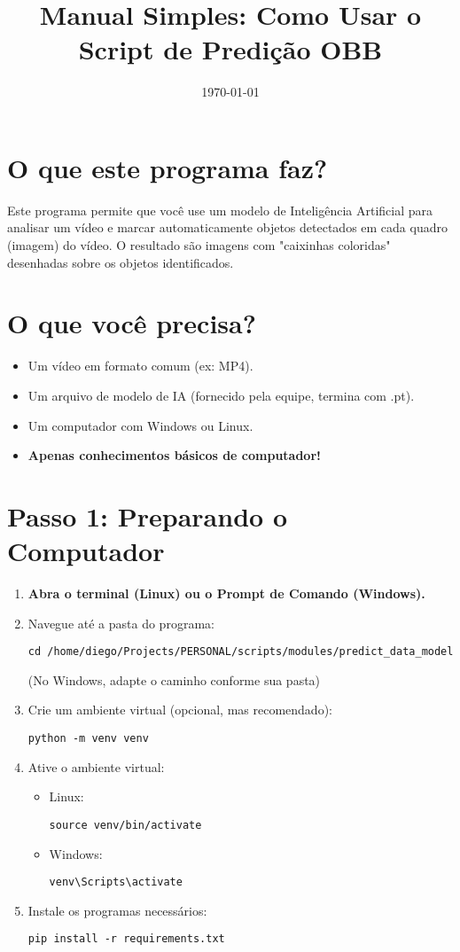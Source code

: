 \documentclass[12pt,a4paper]{article}
\title{Manual Simples: Como Usar o Script de Predição OBB}
\author{}
\date{\today}
\begin{document}
\maketitle

\section*{O que este programa faz?}
Este programa permite que você use um modelo de Inteligência Artificial para analisar um vídeo e marcar automaticamente objetos detectados em cada quadro (imagem) do vídeo. O resultado são imagens com "caixinhas coloridas" desenhadas sobre os objetos identificados.

\section*{O que você precisa?}
\begin{itemize}
    \item Um vídeo em formato comum (ex: MP4).
    \item Um arquivo de modelo de IA (fornecido pela equipe, termina com .pt).
    \item Um computador com Windows ou Linux.
    \item \textbf{Apenas conhecimentos básicos de computador!}
\end{itemize}

\section*{Passo 1: Preparando o Computador}
\begin{enumerate}[label=\arabic*.]
    \item \textbf{Abra o terminal (Linux) ou o Prompt de Comando (Windows).}
    \item Navegue até a pasta do programa:
    \begin{verbatim}
cd /home/diego/Projects/PERSONAL/scripts/modules/predict_data_model
\end{verbatim}
    (No Windows, adapte o caminho conforme sua pasta)
    \item Crie um ambiente virtual (opcional, mas recomendado):
    \begin{verbatim}
python -m venv venv
\end{verbatim}
    \item Ative o ambiente virtual:
    \begin{itemize}
        \item Linux:
        \begin{verbatim}
source venv/bin/activate
\end{verbatim}
        \item Windows:
        \begin{verbatim}
venv\Scripts\activate
\end{verbatim}
    \end{itemize}
    \item Instale os programas necessários:
    \begin{verbatim}
pip install -r requirements.txt
\end{verbatim}
\end{enumerate}
\end{document}
